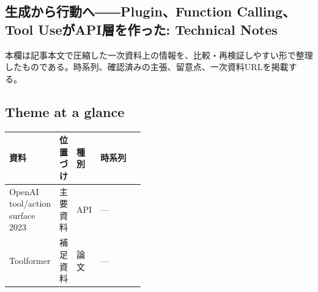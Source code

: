\subsection*{生成から行動へ――Plugin、Function Calling、Tool UseがAPI層を作った: Technical Notes}
本欄は記事本文で圧縮した一次資料上の情報を、比較・再検証しやすい形で整理したものである。時系列、確認済みの主張、留意点、一次資料URLを掲載する。
\smallskip
{}\par
\medskip
\subsection*{Theme at a glance}
\begin{center}
\footnotesize
\begin{tabularx}{\linewidth}{@{}p{0.20\linewidth}p{0.10\linewidth}p{0.14\linewidth}X@{}}
\toprule
資料 & 位置づけ & 種別 & 時系列 \\
\midrule
OpenAI tool/action surface 2023 & 主要資料 & API & — \\
Toolformer & 補足資料 & 論文 & — \\
\bottomrule
\end{tabularx}
\end{center}
\normalsize


